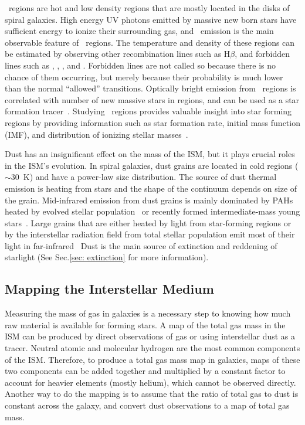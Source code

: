 \hii~regions are hot and low density regions that are mostly located in the disks of spiral galaxies.
High energy UV photons emitted by massive new born stars have sufficient energy to ionize their surrounding gas, and
~\halpha emission is the main observable feature of \hii~regions.
The temperature and density of these regions can be estimated by observing other recombination lines such as H$\beta$, and forbidden lines such as \sii, \oii, \oiii, and \nii. 
Forbidden lines are not called so because there is no chance of them occurring, but merely because their probability is much lower than the normal ``allowed'' transitions.
Optically bright \halpha emission from \hii~regions is correlated with number of new massive stars in regions, and can be used as a star formation tracer~\citep[e.g.][]{Kennicutt98b,Calzetti13}.
Studying \hii~regions provides valuable insight into star forming regions by providing information such as star formation rate, initial mass function (IMF), and distribution of ionizing stellar masses~\citep[][and references therein]{Azimlu11}.


Dust has an insignificant effect on the mass of the ISM, but it plays crucial roles in the ISM's evolution.
In spiral galaxies, dust grains are located in cold regions ($\sim$30~K) and have a power-law size distribution.
The source of dust thermal emission is heating from stars and the shape of the continuum depends on size of the grain.
Mid-infrared emission from dust grains is mainly dominated by PAHs heated by evolved stellar population~\cite{Smith07a} or recently formed intermediate-mass young stars~\cite{Peeters04}. 
Large grains that are either heated by light from star-forming regions or by the interstellar radiation field from total stellar population emit most of their light in far-infrared~\citep[e.g.][]{Calapa14, lu14}
Dust is the main source of extinction and reddening of starlight (See Sec.\ref{sec: extinction} for more information).

\subsection{Mapping the Interstellar Medium} 
\label{sec: ismmap}
Measuring the mass of gas in galaxies is a necessary step to knowing how much raw material is available for forming stars.
A map of the total gas mass in the ISM can be produced by direct observations of gas or using interstellar dust as a tracer. 
Neutral atomic and molecular hydrogen are the most common components of the ISM. 
Therefore, to produce a total gas mass map in galaxies, maps of these two components can be added together and multiplied by a constant factor to account for heavier elements (mostly helium), which cannot be observed directly. 
Another way to do the mapping is to assume that the ratio of total gas to dust is constant across the galaxy, and convert dust observations to a map of total gas mass.

